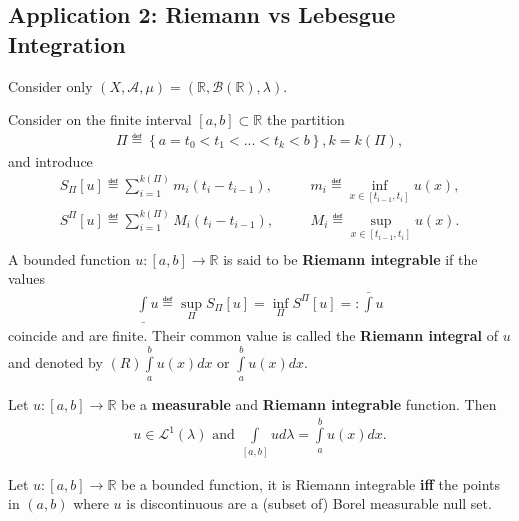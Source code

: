 \subsection*{Application 2: Riemann vs Lebesgue Integration}
Consider only \(\left(X,\mathscr{A},\mu\right) = \left(\mathbb{R},\mathscr{B}(\mathbb{R}),\lambda\right)\).
\begin{definition}
    Consider on the finite interval \([a,b]\subset\mathbb{R}\) the partition
    \begin{align}
        \Pi \eqdef \left\{ a=t_0<t_1<...<t_k<b \right\}, k=k(\Pi),
    \end{align}
    and introduce
    \begin{eqnarray}
        S_{\Pi}[u] \eqdef \sum\limits_{i=1}^{k(\Pi)}m_i(t_i-t_{i-1}), &\quad& m_i \eqdef\inf\limits_{x\in[t_{i-1}, t_i]}u(x), \\
        S^{\Pi}[u] \eqdef \sum\limits_{i=1}^{k(\Pi)}M_i(t_i-t_{i-1}), &\quad& M_i \eqdef\sup\limits_{x\in[t_{i-1}, t_i]}u(x). \\
    \end{eqnarray}
    A bounded function \(u:[a,b]\rightarrow\mathbb{R}\) is said to be \textbf{Riemann integrable} if the values
    \begin{align}
        \int\limits_{\_} u \eqdef \sup\limits_{\Pi}S_{\Pi}[u] = \inf\limits_{\Pi}S^{\Pi}[u] =\mathrel{\mathop:} \int\limits^{\_} u
    \end{align}
    coincide and are finite. Their common value is called the \textbf{Riemann integral} of \(u\) and denoted by 
    \((R)\int\limits_{a}^{b}u(x)dx\) or \(\int\limits_{a}^{b}u(x)dx\).
\end{definition}
\begin{theorem}
    Let \(u:[a,b]\rightarrow\mathbb{R}\) be a \textbf{measurable} and \textbf{Riemann integrable} function. Then
    \begin{align}
        u\in\mathcal{L}^{1}(\lambda) \text{ and } \int\limits_{[a,b]}ud\lambda = \int\limits_{a}^{b}u(x)dx.
    \end{align}
\end{theorem}
\begin{theorem} \label{theorem:12_9}
    Let \(u:[a,b] \rightarrow \mathbb{R}\) be a bounded function, it is Riemann integrable \textbf{iff} the points in \(\left(a,b\right)\) where
    \(u\) is discontinuous are a (subset of) Borel measurable null set.
\end{theorem}

